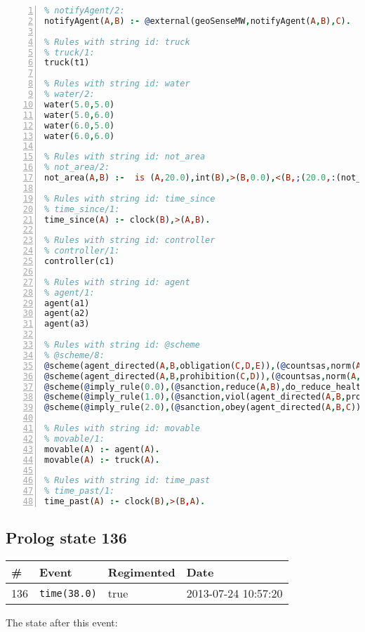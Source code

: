 \documentclass[11pt]{article}\usepackage[utf8]{inputenc}\usepackage{geometry}
\begin{document}
\begin{lstlisting}[language=Prolog, numbers=left]
% Rules with string id: notifyAgent
% notifyAgent/2:
notifyAgent(A,B) :- @external(geoSenseMW,notifyAgent(A,B),C).

% Rules with string id: truck
% truck/1:
truck(t1)

% Rules with string id: water
% water/2:
water(5.0,5.0)
water(5.0,6.0)
water(6.0,5.0)
water(6.0,6.0)

% Rules with string id: not_area
% not_area/2:
not_area(A,B) :-  is (A,20.0),int(B),>(B,0.0),<(B,;(20.0,:(not_area(A,B), is (-(B),20.0)))),int(A),>(A,0.0),<(A,;(20.0,:(area(A,B),-(int(A))))),int(B),>(A,0.0),>(B,0.0),<(A,21.0),<(B,21.0).

% Rules with string id: time_since
% time_since/1:
time_since(A) :- clock(B),>(A,B).

% Rules with string id: controller
% controller/1:
controller(c1)

% Rules with string id: agent
% agent/1:
agent(a1)
agent(a2)
agent(a3)

% Rules with string id: @scheme
% @scheme/8:
@scheme(agent_directed(A,B,obligation(C,D,E)),(@countsas,norm(A,B,F,obligation(C,D,E)),F),false,(listTrue(C)),(time_past(D)),false,[plus(viol(agent_directed(A,B,obligation(C,D,E))))|[]],[plus(obey(agent_directed(A,B,obligation(C,D,E))))|[]])
@scheme(agent_directed(A,B,prohibition(C,D)),(@countsas,norm(A,B,E,prohibition(C,D)),E),(listTrue(C)),false,(false),false,[plus(viol(agent_directed(A,B,prohibition(C,D))))|[]],[plus(obey(agent_directed(A,B,prohibition(C,D))))|[]])
@scheme(@imply_rule(0.0),(@sanction,reduce(A,B),do_reduce_health(A,B),notifyAgent(A,changed(status))),true,false,false,false,[min(reduce(A,B))|[]],[])
@scheme(@imply_rule(1.0),(@sanction,viol(agent_directed(A,B,prohibition(C,D))),do_sanction(D)),true,false,false,false,[min(viol(agent_directed(A,B,prohibition(C,D))))|[]],[])
@scheme(@imply_rule(2.0),(@sanction,obey(agent_directed(A,B,C))),true,false,false,false,[min(obey(agent_directed(A,B,C)))|[]],[])

% Rules with string id: movable
% movable/1:
movable(A) :- agent(A).
movable(A) :- truck(A).

% Rules with string id: time_past
% time_past/1:
time_past(A) :- clock(B),>(B,A).

\end{lstlisting}
\clearpage 
\subsection{Prolog state 136}
\begin{table}[ht]
\centering 
\begin{tabular}{l l l l} 
\textbf{\#} & \textbf{Event} & \textbf{Regimented} & \textbf{Date} \\ [0.5ex] 
\hline
136&\texttt{time(38.0)}&true&2013-07-24 10:57:20\\ [1ex] \hline\end{tabular}
\end{table}
The state after this event:
\end{document}
